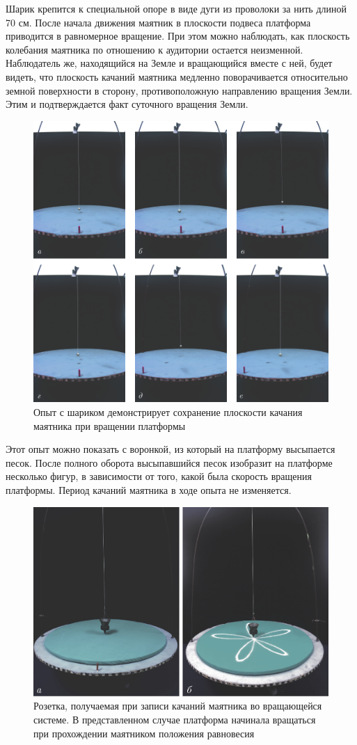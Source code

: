 \documentclass[14pt,a4paper,oneside]{extarticle}	%
\begin{document}
	Шарик крепится к специальной опоре в виде дуги из проволоки за нить длиной 70 см.
	После начала движения маятник в плоскости подвеса платформа приводится в равномерное вращение.
	При этом можно наблюдать, как плоскость колебания маятника по отношению к аудитории остается неизменной.
	Наблюдатель же, находящийся на Земле и вращающийся вместе с ней, 
	будет видеть, что плоскость качаний маятника медленно поворачивается относительно земной 
	поверхности в сторону, противоположную направлению вращения Земли.
	Этим и подтверждается факт суточного вращения Земли.
		
	\begin{figure}[H] 	
		\centering 	
		\includegraphics[width=0.9\linewidth]{fuko-2.png}
		\caption{Опыт с шариком демонстрирует сохранение плоскости качания маятника при вращении платформы}
		\label{fuko-2}
	\end{figure}	
		
	Этот опыт можно показать с воронкой, из который на платформу высыпается песок.
	После полного оборота высыпавшийся песок изобразит на платформе несколько фигур, в зависимости от того, какой была скорость вращения платформы.
	Период качаний маятника в ходе опыта не изменяется.
	
\begin{figure}[H] 	
	\centering 	
	\includegraphics[width=0.75\linewidth]{fuko-3.png}
	\caption{Розетка, получаемая при записи качаний маятника во вращающейся системе. В представленном случае платформа начинала вращаться при прохождении маятником положения равновесия}
	\label{fuko-3}
\end{figure}
\end{document}
